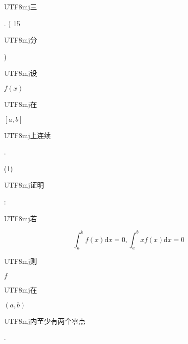 \documentclass[10pt]{article}
\begin{document}
\begin{CJK}{UTF8}{mj}三\end{CJK}. ( 15 \begin{CJK}{UTF8}{mj}分\end{CJK}) \begin{CJK}{UTF8}{mj}设\end{CJK} $f(x)$ \begin{CJK}{UTF8}{mj}在\end{CJK} $[a, b]$ \begin{CJK}{UTF8}{mj}上连续\end{CJK}.

(1) \begin{CJK}{UTF8}{mj}证明\end{CJK}: \begin{CJK}{UTF8}{mj}若\end{CJK}
$$
\int_{a}^{b} f(x) \mathrm{d} x=0, \int_{a}^{b} x f(x) \mathrm{d} x=0
$$
\begin{CJK}{UTF8}{mj}则\end{CJK} $f$ \begin{CJK}{UTF8}{mj}在\end{CJK} $(a, b)$ \begin{CJK}{UTF8}{mj}内至少有两个零点\end{CJK}.
\end{document}
